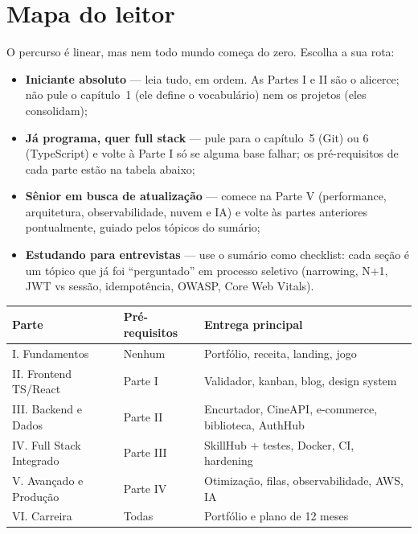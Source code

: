 \section*{Mapa do leitor}
O percurso é linear, mas nem todo mundo começa do zero. Escolha a sua rota:

\begin{itemize}[leftmargin=*, itemsep=0.4em]
  \item \textbf{Iniciante absoluto} — leia tudo, em ordem. As Partes I e II
  são o alicerce; não pule o capítulo~1 (ele define o vocabulário) nem os
  projetos (eles consolidam);
  \item \textbf{Já programa, quer full stack} — pule para o capítulo~5 (Git)
  ou 6 (TypeScript) e volte à Parte I só se alguma base falhar; os
  pré-requisitos de cada parte estão na tabela abaixo;
  \item \textbf{Sênior em busca de atualização} — comece na Parte V
  (performance, arquitetura, observabilidade, nuvem e IA) e volte às partes
  anteriores pontualmente, guiado pelos tópicos do sumário;
  \item \textbf{Estudando para entrevistas} — use o sumário como checklist:
  cada seção é um tópico que já foi ``perguntado'' em processo seletivo
  (narrowing, N+1, JWT vs sessão, idempotência, OWASP, Core Web Vitals).
\end{itemize}

\begin{center}
\small
\begin{tabularx}{\textwidth}{@{}l l X@{}}
\toprule
\textbf{Parte} & \textbf{Pré-requisitos} & \textbf{Entrega principal} \\
\midrule
I. Fundamentos & Nenhum & Portfólio, receita, landing, jogo \\
II. Frontend TS/React & Parte I & Validador, kanban, blog, design system \\
III. Backend e Dados & Parte II & Encurtador, CineAPI, e-commerce, biblioteca, AuthHub \\
IV. Full Stack Integrado & Parte III & SkillHub + testes, Docker, CI, hardening \\
V. Avançado e Produção & Parte IV & Otimização, filas, observabilidade, AWS, IA \\
VI. Carreira & Todas & Portfólio e plano de 12 meses \\
\bottomrule
\end{tabularx}
\end{center}

